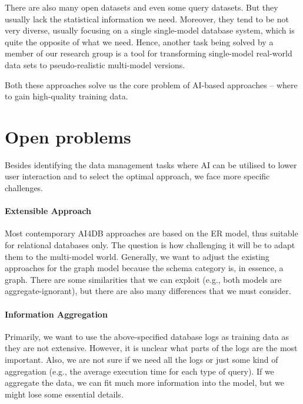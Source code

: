 There are also many open datasets and even some query datasets. But they usually lack the statistical information we need. Moreover, they tend to be not very diverse, usually focusing on a single single-model database system, which is quite the opposite of what we need. Hence, another task being solved by a member of our research group is a tool for transforming single-model real-world data sets to pseudo-realistic multi-model versions.

Both these approaches solve us the core problem of AI-based approaches -- where to gain high-quality training data.

\section{Open problems}
Besides identifying the data management tasks where AI can be utilised to lower user interaction and to select the optimal approach, we face more specific challenges.

\paragraph{Extensible Approach} Most contemporary AI4DB approaches are based on the ER model, thus suitable for relational databases only. The question is how challenging it will be to adapt them to the multi-model world.
Generally, we want to adjust the existing approaches for the graph model because the schema category is, in essence, a graph. There are some similarities that we can exploit (e.g., both models are aggregate-ignorant), but there are also many differences that we must consider.

\paragraph{Information Aggregation} Primarily, we want to use the above-specified database logs as training data as they are not extensive. However, it is unclear what parts of the logs are the most important. Also, we are not sure if we need all the logs or just some kind of aggregation (e.g., the average execution time for each type of query). If we aggregate the data, we can fit much more information into the model, but we might lose some essential details.

